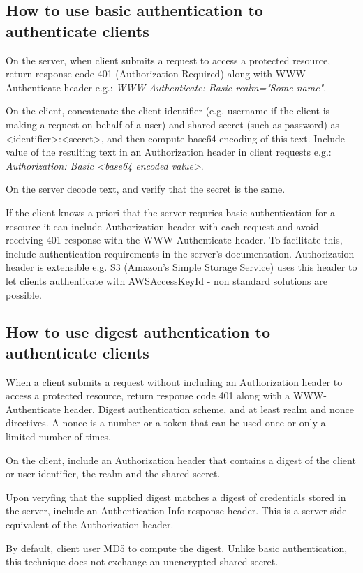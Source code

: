 \documentclass[11pt,a4paper]{article}
\begin{document}
\subsection{How to use basic authentication to authenticate clients}
On the server, when client submits a request to access a protected resource, return response code 401 (Authorization Required) along with WWW-Authenticate header e.g.: \textit{WWW-Authenticate: Basic realm="Some name"}.

On the client, concatenate the client identifier (e.g. username if the client is making a request on behalf of a user) and shared secret (such as password) as <identifier>:<secret>, and then compute base64 encoding of this text. Include value of the resulting text in an Authorization header in client requests e.g.: \textit{Authorization: Basic <base64 encoded value>}.

On the server decode text, and verify that the secret is the same.

If the client knows a priori that the server requries basic authentication for a resource it can include Authorization header with each request and avoid receiving 401 response with the WWW-Authenticate header. To facilitate this, include authentication requirements in the server's documentation. Authorization header is extensible e.g. S3 (Amazon's Simple Storage Service) uses this header to let clients authenticate with AWSAccessKeyId - non standard solutions are possible.

\subsection{How to use digest authentication to authenticate clients}
When a client submits a request without including an Authorization header to access a protected resource, return response code 401 along with a WWW-Authenticate header, Digest authentication scheme, and at least realm and nonce directives. A nonce is a number or a token that can be used once or only a limited number of times.

On the client, include an Authorization header that contains a digest of the client or user identifier, the realm and the shared secret.

Upon veryfing that the supplied digest matches a digest of credentials stored in the server, include an Authentication-Info response header. This is a server-side equivalent of the Authorization header.

By default, client user MD5 to compute the digest. Unlike basic authentication, this technique does not exchange an unencrypted shared secret.
\end{document}

